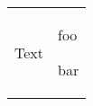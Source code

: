 \documentclass{article}
\begin{document}
\begin{tabular}{c|p{6cm}|}
	Text
	&
	\begin{enumerate*}[label=(\arabic*.),itemjoin={\newline}]
		\item foo
		\item bar
	\end{enumerate*}
\end{tabular}
\end{document}
